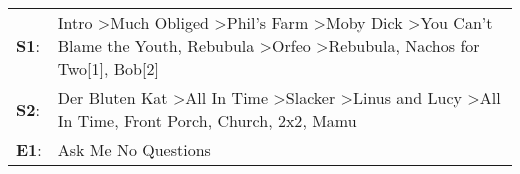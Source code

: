 \begin{supertabular}{p{0.03\textwidth}p{0.92\textwidth}}
 \textbf{S1}:  &  Intro\textsuperscript{} \textgreater \enspace Much Obliged\textsuperscript{} \textgreater \enspace Phil's Farm\textsuperscript{} \textgreater \enspace Moby Dick\textsuperscript{} \textgreater \enspace You Can't Blame the Youth\textsuperscript{}, \enspace Rebubula\textsuperscript{} \textgreater \enspace Orfeo\textsuperscript{} \textgreater \enspace Rebubula\textsuperscript{}, \enspace Nachos for Two[1]\textsuperscript{}, \enspace Bob[2]\textsuperscript{}  \enspace  \\
 \textbf{S2}:  &                                                                                Der Bluten Kat\textsuperscript{} \textgreater \enspace All In Time\textsuperscript{} \textgreater \enspace Slacker\textsuperscript{} \textgreater \enspace Linus and Lucy\textsuperscript{} \textgreater \enspace All In Time\textsuperscript{}, \enspace Front Porch\textsuperscript{}, \enspace Church\textsuperscript{}, \enspace 2x2\textsuperscript{}, \enspace Mamu\textsuperscript{}  \enspace  \\
 \textbf{E1}:  &                                                                                                                                                                                                                                                                                                                                                                                                                                      Ask Me No Questions\textsuperscript{}  \enspace  \\
\end{supertabular}
